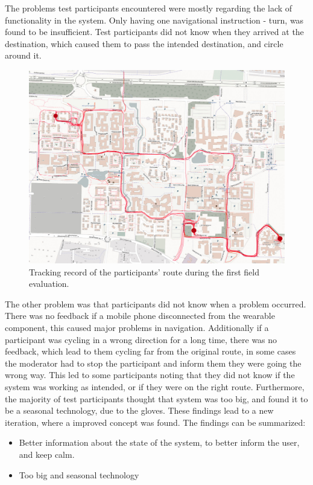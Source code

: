 \documentclass{sigchi}
\begin{document}
The problems test participants encountered were mostly regarding the lack of functionality in the system. Only having one navigational instruction - turn, was found to be insufficient. Test participants did not know when they arrived at the destination, which caused them to pass the intended destination, and circle around it.
\begin{figure}[!b]
  \centering
  \includegraphics[width=1.02\columnwidth]{figures/heatmap.jpg}
  \caption{Tracking record of the participants' route during the first field evaluation.}
    \label{fig:heatmap}
\end{figure} 
The other problem was that participants did not know when a problem occurred. There was no feedback if a mobile phone disconnected from the wearable component, this caused major problems in navigation. Additionally if a participant was cycling in a wrong direction for a long time, there was no feedback, which lead to them cycling far from the original route, in some cases the moderator had to stop the participant and inform them they were going the wrong way. This led to some participants noting that they did not know if the system was working as intended, or if they were on the right route.
\newline
\newline
Furthermore, the majority of test participants thought that system was too big, and found it to be a seasonal technology, due to the gloves.
These findings lead to a new iteration, where a improved concept was found. The findings can be summarized:
\begin{itemize}
\item Better information about the state of the system, to better inform the user, and keep calm.
\item Too big and seasonal technology 
\end{itemize}  
\end{document}
